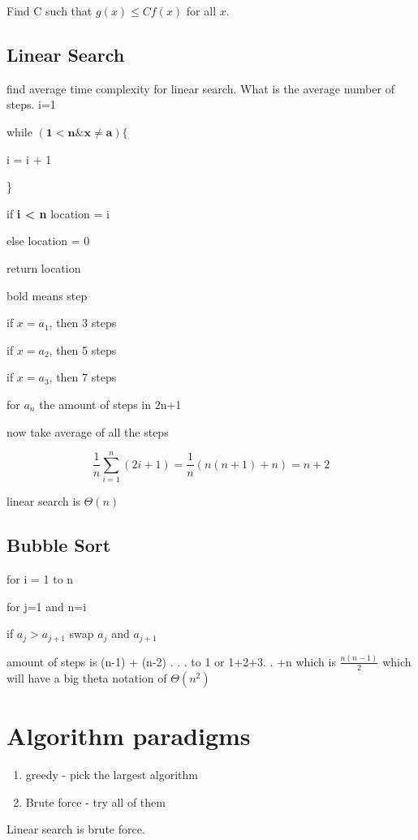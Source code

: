 \documentclass{report}
\begin{document}
Find C such that $g(x) \leq Cf(x)$ for all $x$.


\newpage
\subsection{Linear Search}
find average time complexity for linear search. What is the average number of steps.
i=1

while $(\mathbf{1 < n} \& \mathbf{x \neq a}) \{$

i = i + 1

\}

if \textbf{i < n} location = i

else location = 0

return location
\newline

bold means step

if $x = a_1$, then 3 steps

if $x = a_2$, then 5 steps

if $x = a_3$, then 7 steps

for $a_n$ the amount of steps in 2n+1

now take average of all the steps

\[
\frac{1}{n} \sum^{n}_{i=1}(2i+1) = \frac{1}{n}(n(n+1) + n) = n+2
\]

linear search is $\Theta(n)$



\subsection{Bubble Sort}
for i = 1 to n

for j=1 and n=i

if $a_j > a_{j+1}$ swap $a_j$ and $a_{j+1}$
\newline

amount of steps is (n-1) + (n-2) . . . to 1 or 1+2+3. .  +n which is $\frac{n(n-1)}{2}$ which will have a big theta notation of $\Theta (n^2)$


\section{Algorithm paradigms}
\begin{enumerate}
\item
greedy - pick the largest algorithm
\item
Brute force - try all of them
\end{enumerate}

Linear search is brute force.
\end{document}
